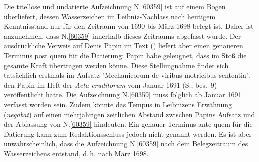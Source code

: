 \begin{ledgroup}%
\footnotesize%
\pstart%
\noindent%
%
Die titellose und undatierte Aufzeichnung N.\;\ref{60359} ist auf einem Bogen überliefert, dessen Wasserzeichen %
im Leibniz-Nachlass nach heutigem Kenntnisstand nur für den Zeitraum von 1690 bis März 1698 belegt ist.
Daher ist anzunehmen, dass N.\;\ref{60359} innerhalb dieses Zeitraums abgefasst wurde.
Der ausdrückliche Verweis auf Denis Papin im Text () liefert aber einen genaueren Terminus post quem für die Datierung:
Papin habe \glqq geleugnet\grqq, dass im Stoß die gesamte Kraft übertragen werden könne.
Diese Stellungnahme findet sich tatsächlich erstmals im Aufsatz "Mechanicorum de viribus motricibus sententia", den Papin im Heft der \textit{Acta eruditorum} vom Januar 1691 (S., bes.\ 9)\cite{00537} veröffentlicht hatte.
Die Aufzeichnung N.\;\ref{60359} muss folglich ab Januar 1691 verfasst worden sein.
Zudem könnte das Tempus in Leibnizens Erwähnung (\textit{negabat}) auf einen mehrjährigen zeitlichen Abstand zwischen Papins Aufsatz und der Abfassung von N.\;\ref{60359} hindeuten.
Ein genauer Terminus ante quem für die Datierung kann zum Redaktionsschluss jedoch nicht genannt werden.
Es ist aber unwahrscheinlich, dass die Aufzeichnung N.\;\ref{60359} nach dem Belegzeitraum des Wasserzeichens entstand, d.\,h. nach März 1698.
\pend%
\end{ledgroup}%
%
\frenchspacing%
\normalsize%
